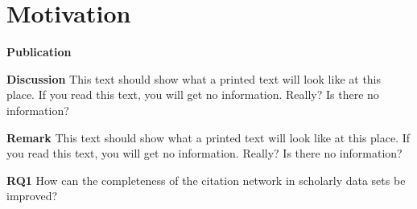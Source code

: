 

\section{Motivation}



\begin{infobox-pub}
\textbf{Publication} 
\end{infobox-pub}

\begin{infobox-discussion}
\textbf{Discussion} This text should show what a printed text will look like at this place. If you read this text, you will get no information. Really? Is there no information?
\end{infobox-discussion}

\begin{infobox-info}
\textbf{Remark} This text should show what a printed text will look like at this place. If you read this text, you will get no information. Really? Is there no information?
\end{infobox-info}

\begin{infobox-q}
\textbf{RQ1} How can the completeness of the citation network in scholarly data sets be improved?
\end{infobox-q}

